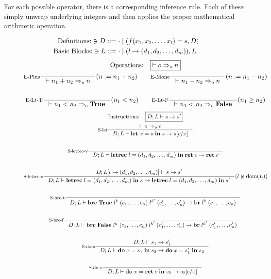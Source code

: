 \documentclass[a4paper, oneside, 10pt, draft]{memoir}
\begin{document}
For each possible operator, there is a corresponding inference
rule. Each of these simply unwrap underlying integers and then applies
the proper mathematical arithmetic operation.
\newcommand{\meval}{:=}
\begin{figure}
  \begin{align*}
    \text{Definitions:} \ni D & ::= \cdot \; \vert \; (f(x_1, x_2, \dotsc,
    x_l) = s, D)\\
    \text{Basic Blocks:} \ni L & ::= \cdot \; \vert \; (l \mapsto (d_1, d_2, \dotsc, d_m)),L
  \end{align*}
  \begin{gather*}
    \text{Operations:} \quad \boxed{|- o \eop n}\\
    \inference[E-Plus]{}{|- n_1 + n_2 \eop n}(n \meval n_1 + n_2)
    \quad \quad
    \inference[E-Mone]{}{|- n_1 - n_2 \eop n}(n \meval n_1 - n_2)\\\\
    \inference[E-Lt-T]{}{|- n_1  < n_2 \eop \btrue}(n_1 < n_2) \quad \quad
    \inference[E-Lt-F]{}{|- n_1  < n_2 \eop \bfalse}(n_1 \geq n_2)
  \end{gather*}
  \begin{gather*}
    \text{Instructions:} \quad \boxed{D;L |- s -> s'}\\
    \inference[S-let]{|- o \eop c}{D;L |- \ilet{x}{o}{s} -> s[c/x]}\\\\
    \inference[S-letrec-v]{}{D;L |- \iletrec{l}{\dbundle}
      {\iret{c}} -> \iret{c}}\\\\
    \inference[S-letrec-s]{D;L[l \mapsto \dbundle] |- s -> s'}
    {D;L |- \iletrec{l}{\dbundle}{s} -> \iletrec{l}{\dbundle}{s'}}(l \not \in \dom{L})\\\\
    \inference[S-brc-t]{}{D;L |-
      \ibrc{\btrue}{l^k}{(c_1, \dotsc, c_n)}{l^{k'}}{(c'_1, \dotsc,
        c'_n)} -> \ibr{l^k}{(c_1, \dotsc, c_n)}}\\\\
    \inference[S-brc-f]{}{D;L |-
      \ibrc{\bfalse}{l^k}{(c_1, \dotsc, c_n)}{l^{k'}}{(c'_1, \dotsc, c'_n)} ->
      \ibr{l^{k'}}{(c'_1, \dotsc, c'_n)}}\\\\
    \inference[S-do-s]{D;L |- s_1 -> s'_1}{D;L |-
      \ido{x}{s_1}{s_2} -> \ido{x}{s'_1}{s_2}}\\\\
    \inference[S-do-v]{}{D;L |- \ido{x}{\iret{c}}{s_2} -> s_2[c/x]}\\\\

\end{gather*}
\end{figure}
\end{document}
